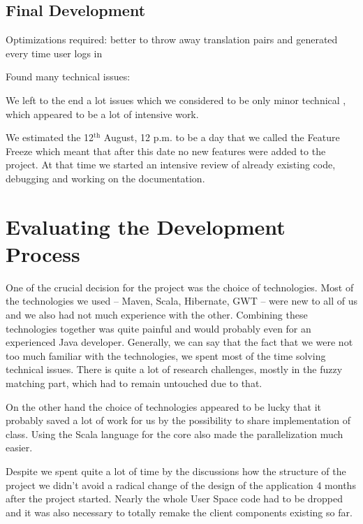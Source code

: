 \subsection{Final Development}
\label{subsec:final_development}

Optimizations required: better to throw away translation pairs and generated every time user logs in

Found many technical issues: %


We left to the end a lot issues which we considered to be only minor technical , which appeared to be a lot of intensive work.

We estimated the 12$^\mathrm{th}$ August, 12 p.m. to be a day that we called the Feature Freeze which meant that after this date no new features were added to the project. At that time we started an intensive review of already existing code, debugging and working on the documentation. 

\section{Evaluating the Development Process}

One of the crucial decision for the project was the choice of technologies. Most of the technologies we used -- Maven, Scala, Hibernate, GWT -- were new to all of us and we also had not much experience with the other. Combining these technologies together was quite painful and would probably even for an experienced Java developer. Generally, we can say that the fact that we were not too much familiar with the technologies, we spent most of the time solving technical issues. There is quite a lot of research challenges, mostly in the fuzzy matching part, which had to remain untouched due to that.

On the other hand the choice of technologies appeared to be lucky that it probably saved a lot of work for us by the possibility to share implementation of class. Using the Scala language for the core also made the parallelization much easier.

Despite we spent quite a lot of time by the discussions how the structure of the project we didn't avoid a radical change of the design of the application 4 months after the project started. Nearly the whole User Space code had to be dropped and it was also necessary to totally remake the client components existing so far.

